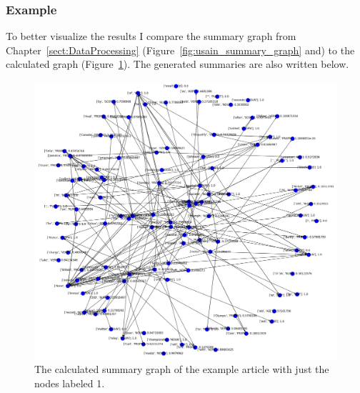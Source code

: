 \subsubsection{Example}
To better visualize the results I compare the summary graph from Chapter~\ref{sect:DataProcessing} (Figure~\ref{fig:usain_summary_graph} and) to the calculated graph (Figure~\ref{fig:usain_bolt_predicted0}). The generated summaries are also written below.

\begin{figure}[!ht]
	\centering
	\includegraphics[width=150mm, keepaspectratio]{figures/usain_bolt_predicted.png}
	\caption{The calculated summary graph of the example article with just the nodes labeled 1.}
	\label{fig:usain_bolt_predicted0}
\end{figure}

\FloatBarrier


